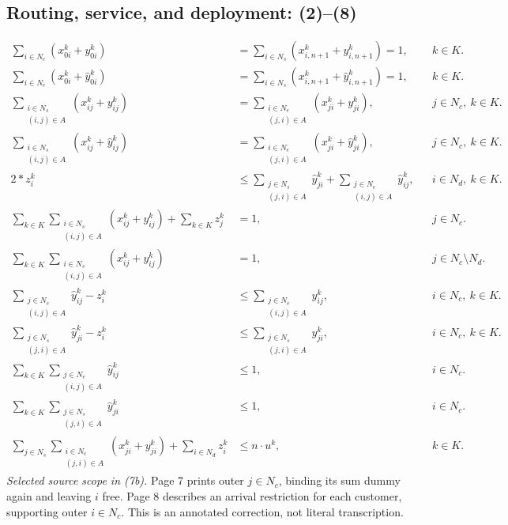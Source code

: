 \documentclass[10pt]{article}
\begin{document}
\subsection*{Routing, service, and deployment: (2)--(8)}
\begin{align}
\sum_{i\in N_e}(x_{0i}^k+y_{0i}^k)
&=\sum_{i\in N_s}(x_{i,n+1}^k+y_{i,n+1}^k)=1,
&&k\in K.\tag{2a}\\
\sum_{i\in N_e}(x_{0i}^k+\hat y_{0i}^k)
&=\sum_{i\in N_s}(x_{i,n+1}^k+\hat y_{i,n+1}^k)=1,
&&k\in K.\tag{2b}\\
\sum_{\substack{i\in N_s\\(i,j)\in A}}(x_{ij}^k+y_{ij}^k)
&=\sum_{\substack{i\in N_e\\(j,i)\in A}}(x_{ji}^k+y_{ji}^k),
&&j\in N_c,\ k\in K.\tag{3a}\\
\sum_{\substack{i\in N_s\\(i,j)\in A}}(x_{ij}^k+\hat y_{ij}^k)
&=\sum_{\substack{i\in N_e\\(j,i)\in A}}(x_{ji}^k+\hat y_{ji}^k),
&&j\in N_c,\ k\in K.\tag{3b}\\
2*z_i^k&\leq\sum_{\substack{j\in N_s\\(j,i)\in A}}\hat y_{ji}^k+\sum_{\substack{j\in N_e\\(i,j)\in A}}\hat y_{ij}^k,
&&i\in N_d,\ k\in K.\tag{4}\\
\sum_{k\in K}\sum_{\substack{i\in N_s\\(i,j)\in A}}(x_{ij}^k+y_{ij}^k)+\sum_{k\in K}z_j^k&=1,
&&j\in N_c.\tag{5a}\\
\sum_{k\in K}\sum_{\substack{i\in N_s\\(i,j)\in A}}(x_{ij}^k+y_{ij}^k)&=1,
&&j\in N_c\setminus N_d.\tag{5b}\\
\sum_{\substack{j\in N_e\\(i,j)\in A}}\hat y_{ij}^k-z_i^k&\leq\sum_{\substack{j\in N_e\\(i,j)\in A}}y_{ij}^k,
&&i\in N_c,\ k\in K.\tag{6a}\\
\sum_{\substack{j\in N_s\\(j,i)\in A}}\hat y_{ji}^k-z_i^k&\leq\sum_{\substack{j\in N_s\\(j,i)\in A}}y_{ji}^k,
&&i\in N_c,\ k\in K.\tag{6b}\\
\sum_{k\in K}\sum_{\substack{j\in N_e\\(i,j)\in A}}\hat y_{ij}^k&\leq1,
&&i\in N_c.\tag{7a}\\
\sum_{k\in K}\sum_{\substack{j\in N_s\\(j,i)\in A}}\hat y_{ji}^k&\leq1,
&&i\in N_c.\tag{7b}\\
\sum_{j\in N_s}\sum_{\substack{i\in N_c\\(j,i)\in A}}(x_{ji}^k+y_{ji}^k)+\sum_{i\in N_d}z_i^k&\leq n\cdot u^k,
&&k\in K.\tag{8}
\end{align}
\noindent\emph{Selected source scope in (7b).}
Page 7 prints outer $j\in N_c$, binding its sum dummy again and leaving $i$
free. Page 8 describes an arrival restriction for each customer, supporting
outer $i\in N_c$. This is an annotated correction, not literal transcription.
\end{document}
